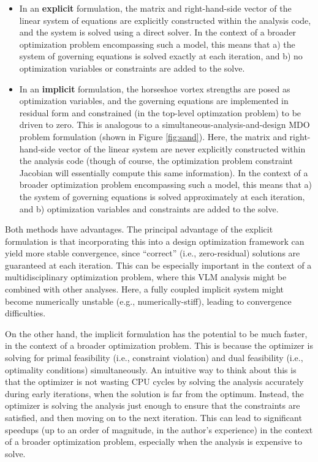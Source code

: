 \begin{itemize}
    \item In an \textbf{explicit} formulation, the matrix and right-hand-side vector of the linear system of equations are explicitly constructed within the analysis code, and the system is solved using a direct solver. In the context of a broader optimization problem encompassing such a model, this means that a) the system of governing equations is solved exactly at each iteration, and b) no optimization variables or constraints are added to the solve.

    \item In an \textbf{implicit} formulation, the horseshoe vortex strengths are posed as optimization variables, and the governing equations are implemented in residual form and constrained (in the top-level optimzation problem) to be driven to zero. This is analogous to a simultaneous-analysis-and-design MDO problem formulation (shown in Figure \ref{fig:sand}). Here, the matrix and right-hand-side vector of the linear system are never explicitly constructed within the analysis code (though of course, the optimization problem constraint Jacobian will essentially compute this same information). In the context of a broader optimization problem encompassing such a model, this means that a) the system of governing equations is solved approximately at each iteration, and b) optimization variables and constraints are added to the solve.

\end{itemize}

Both methods have advantages. The principal advantage of the explicit formulation is that incorporating this into a design optimization framework can yield more stable convergence, since ``correct'' (i.e., zero-residual) solutions are guaranteed at each iteration. This can be especially important in the context of a multidisciplinary optimization problem, where this VLM analysis might be combined with other analyses. Here, a fully coupled implicit system might become numerically unstable (e.g., numerically-stiff), leading to convergence difficulties.

On the other hand, the implicit formulation has the potential to be much faster, in the context of a broader optimization problem. This is because the optimizer is solving for primal feasibility (i.e., constraint violation) and dual feasibility (i.e., optimality conditions) simultaneously. An intuitive way to think about this is that the optimizer is not wasting CPU cycles by solving the analysis accurately during early iterations, when the solution is far from the optimum. Instead, the optimizer is solving the analysis just enough to ensure that the constraints are satisfied, and then moving on to the next iteration. This can lead to significant speedups (up to an order of magnitude, in the author's experience) in the context of a broader optimization problem, especially when the analysis is expensive to solve.

